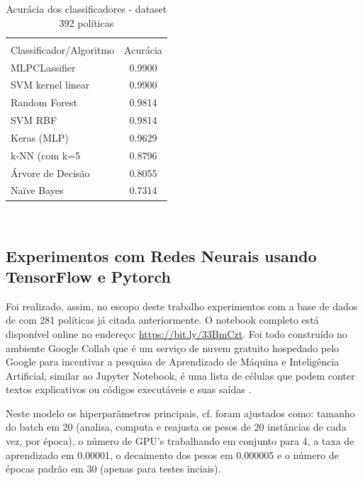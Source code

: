 \begin{table}[h]
	\centering
	\caption{Acurácia dos classificadores - dataset 392 políticas}
	\label{tab:acuracias2}
	\vspace{0.3cm}
	\begin{tabular}{p{6cm}c}
		\hline\\
		Classificador/Algoritmo& Acurácia  \\[10pt] 
		\hline
		MLPCLassifier~		   & 0.9900    \\
		SVM kernel linear~     & 0.9900    \\
		Random Forest		   & 0.9814   \\
		SVM RBF                & 0.9814    \\
		Keras (MLP)            & 0.9629    \\
		k-NN (com k=5          & 0.8796    \\
		Árvore de Decisão	   & 0.8055    \\
		Naïve Bayes~		   & 0.7314    \\		
		\hline
	\end{tabular}
	\\[6pt]		
\end{table}

\subsection{Experimentos com Redes Neurais usando TensorFlow e Pytorch}\label{exp:tensorflow-pytorch}
Foi realizado, assim, no escopo deste trabalho experimentos com a base de dados de com 281 políticas já citada anteriormente. O notebook completo está disponível online no endereço: \url{https://bit.ly/33BmCzt}. Foi todo construído no ambiente Google Collab que é um serviço de nuvem gratuito hospedado pelo Google para incentivar a pesquisa de Aprendizado de Máquina e Inteligência Artificial, similar ao Jupyter Notebook, é uma lista de células que podem conter textos explicativos ou códigos executáveis e suas saídas \cite{collab_2020}.

Neste modelo os hiperparâmetros principais, cf.  foram ajustados como: tamanho do batch em 20 (analisa, computa e reajusta os pesos de 20 instâncias de cada vez, por época), o número de GPU's trabalhando em conjunto para 4, a taxa de aprendizado em 0.00001, o decaimento dos pesos em 0.000005 e o número de épocas padrão em 30 (apenas para testes inciais).

